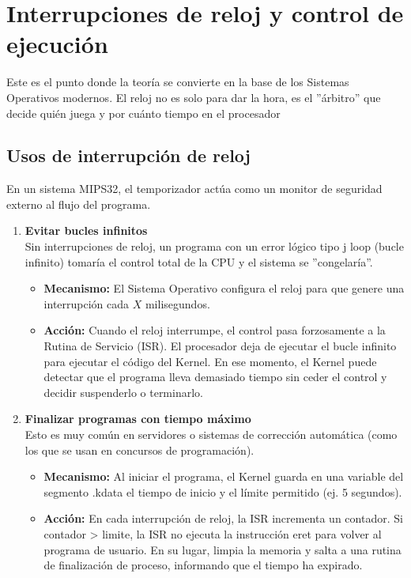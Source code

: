 \documentclass[]{article}
\begin{document}
\section{Interrupciones de reloj y control de ejecución}
	Este es el punto donde la teoría se convierte en la base de los Sistemas Operativos modernos. El reloj no es solo para dar la hora, es el ''árbitro'' que decide quién juega y por cuánto tiempo en el procesador
	
	\subsection{Usos de interrupción de reloj}
		En un sistema MIPS32, el temporizador actúa como un monitor de seguridad externo al flujo del programa.
		\begin{enumerate}
			\item \textbf{Evitar bucles infinitos}\\
			Sin interrupciones de reloj, un programa con un error lógico tipo j loop (bucle infinito) tomaría el control total de la CPU y el sistema se ''congelaría''.
			\begin{itemize}
				\item \textbf{Mecanismo:} El Sistema Operativo configura el reloj para que genere una interrupción cada $X$ milisegundos.
				\item \textbf{Acción:} Cuando el reloj interrumpe, el control pasa forzosamente a la Rutina de Servicio (ISR). El procesador deja de ejecutar el bucle infinito para ejecutar el código del Kernel. En ese momento, el Kernel puede detectar que el programa lleva demasiado tiempo sin ceder el control y decidir suspenderlo o terminarlo.
			\end{itemize}
			\item \textbf{Finalizar programas con tiempo máximo}\\
			Esto es muy común en servidores o sistemas de corrección automática (como los que se usan en concursos de programación).
			\begin{itemize}
				\item \textbf{Mecanismo:} Al iniciar el programa, el Kernel guarda en una variable del segmento .kdata el tiempo de inicio y el límite permitido (ej. 5 segundos).
				\item \textbf{Acción:} En cada interrupción de reloj, la ISR incrementa un contador. Si contador > limite, la ISR no ejecuta la instrucción eret para volver al programa de usuario. En su lugar, limpia la memoria y salta a una rutina de finalización de proceso, informando que el tiempo ha expirado.
			\end{itemize}
			
		\end{enumerate}
		
\end{document}
